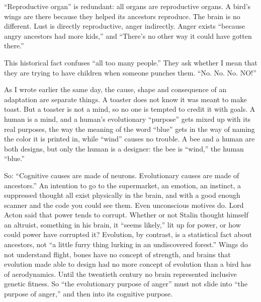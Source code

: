 
``Reproductive organ'' is redundant: all organs are reproductive organs. A bird's wings are there because they helped its ancestors reproduce. The brain is no different. Lust is directly reproductive, anger indirectly. Anger exists ``because angry ancestors had more kids,'' and ``There's no other way it could have gotten there.'' 

This historical fact confuses ``all too many people.'' They ask whether I mean that they are trying to have children when someone punches them.  ``No. No. No. NO!''

As I wrote earlier the same day, the cause, shape and consequence of an adaptation are separate things. A toaster does not know it was meant to make toast. But a toaster is not a mind, so no one is tempted to credit it with goals. A human is a mind, and a human's evolutionary ``purpose'' gets mixed up with its real purposes, the way the meaning of the word ``blue'' gets in the way of naming the color it is printed in, while ``wind'' causes no trouble. A bee and a human are both designs, but only the human is a designer: the bee is ``wind,'' the human ``blue.''

So: ``Cognitive causes are made of neurons. Evolutionary causes are made of ancestors.''  An intention to go to the supermarket, an emotion, an instinct, a suppressed thought all exist physically in the brain, and with a good enough scanner and the code you could see them. Even unconscious motives do. Lord Acton said that power tends to corrupt. Whether or not Stalin thought himself an altruist, something in his brain, it ``seems likely,'' lit up for power, or how could power have corrupted it? Evolution, by contrast, is a statistical fact about ancestors, not ``a little furry thing lurking in an undiscovered forest.'' Wings do not understand flight, bones have no concept of strength, and brains that evolution made able to design had no more concept of evolution than a bird has of aerodynamics. Until the twentieth century no brain represented inclusive genetic fitness. So ``the evolutionary purpose of anger'' must not slide into ``the purpose of anger,'' and then into its cognitive purpose.

